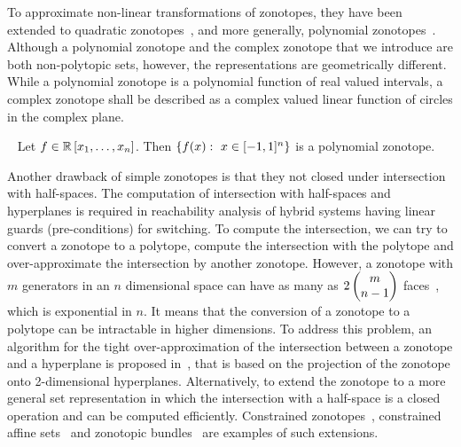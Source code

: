 To approximate non-linear transformations of zonotopes, they have been
extended to quadratic zonotopes~\cite{DBLP:conf/aplas/AdjeGW15}, and
more generally, polynomial
zonotopes~\cite{DBLP:conf/hybrid/Althoff13}.  Although a polynomial
zonotope and the complex zonotope that we introduce are both
non-polytopic sets, however, the representations are geometrically
different.  While a polynomial zonotope is a polynomial function of
real valued intervals, a complex zonotope shall be described as a
complex valued linear function of circles in the complex plane.
%
\begin{definition}~\cite{DBLP:conf/hybrid/Althoff13}
Let $f\in\mathbb{R}\left[x_1,\ldots,x_n\right]$.  Then
$\left\{f(x):~x\in[-1,1]^n\right\}$ is a polynomial zonotope.
\end{definition}
%
Another drawback of simple zonotopes is that they not closed under
intersection with half-spaces.  The computation of intersection with
half-spaces and hyperplanes is required in reachability analysis of
hybrid systems having linear guards (pre-conditions) for switching.
To compute the intersection, we can try to convert a zonotope to a
polytope, compute the intersection with the polytope and
over-approximate the intersection by another zonotope.  However, a
zonotope with $m$ generators in an $n$ dimensional space can have as
many as $2\left(\begin{matrix}m\\n-1\end{matrix}\right)$
  faces~\cite{zaslavsky1975facing}, which is exponential in $n$.  It
  means that the conversion of a zonotope to a polytope can be
  intractable in higher dimensions.  To address this problem, an
  algorithm for the tight over-approximation of the intersection
  between a zonotope and a hyperplane is proposed
  in~\cite{girard2008zonotope}, that is based on the projection of the
  zonotope onto 2-dimensional hyperplanes.  Alternatively, to extend
  the zonotope to a more general set representation in which the
  intersection with a half-space is a closed operation and can be
  computed efficiently.  Constrained
  zonotopes~\cite{scott2016constrained}, constrained affine
  sets~\cite{Ghorbal2010} and zonotopic
  bundles~\cite{althoff2011zonotope} are examples of such extensions.

